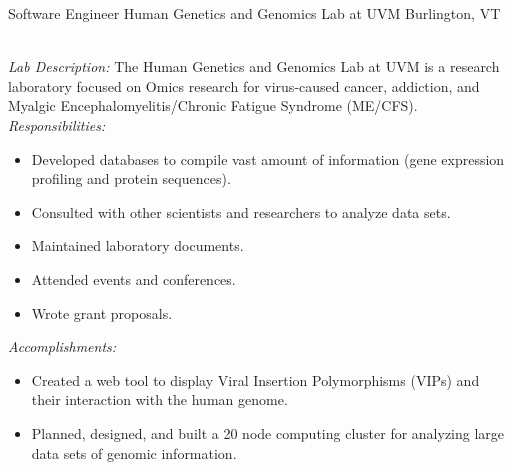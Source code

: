 \begin{samepage}
	{Software Engineer}
	{Human Genetics and Genomics Lab at UVM}
	{Burlington, VT}{}
	{
		\emph{\\Lab Description:}
		The Human Genetics and Genomics Lab at UVM is a research laboratory
		focused on Omics research for virus-caused cancer, addiction, and
		Myalgic Encephalomyelitis/Chronic Fatigue Syndrome (ME/CFS).
		\newline{}
		\newline{}
		\emph{Responsibilities:}
		\begin{itemize}
			\item Developed databases to compile vast amount of information (gene expression profiling and protein sequences).
			\item Consulted with other scientists and researchers to analyze data sets.
			\item Maintained laboratory documents.
			\item Attended events and conferences.
			\item Wrote grant proposals.\\
		\end{itemize}
		\emph{Accomplishments:}
		\begin{itemize}
			\item Created a web tool to display Viral Insertion Polymorphisms (VIPs) and their interaction with the human genome.
			\item Planned, designed, and built a 20 node computing cluster for analyzing large data sets of genomic information.\\
		\end{itemize}
	}
\end{samepage}

